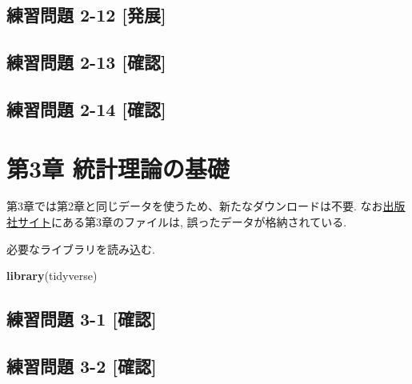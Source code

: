 \documentclass[
]{book}
\newenvironment{Shaded}{\begin{snugshade}}{\end{snugshade}}
\newcommand{\FunctionTok}[1]{\textcolor[rgb]{0.13,0.29,0.53}{\textbf{#1}}}
\newcommand{\NormalTok}[1]{#1}
\begin{document}
\hypertarget{ux7df4ux7fd2ux554fux984c-2-12-ux767aux5c55}{%
\section*{練習問題 2-12 {[}発展{]}}\label{ux7df4ux7fd2ux554fux984c-2-12-ux767aux5c55}}

\hypertarget{ux7df4ux7fd2ux554fux984c-2-13-ux78baux8a8d}{%
\section*{練習問題 2-13 {[}確認{]}}\label{ux7df4ux7fd2ux554fux984c-2-13-ux78baux8a8d}}

\hypertarget{ux7df4ux7fd2ux554fux984c-2-14-ux78baux8a8d}{%
\section*{練習問題 2-14 {[}確認{]}}\label{ux7df4ux7fd2ux554fux984c-2-14-ux78baux8a8d}}

\hypertarget{ch3}{%
\chapter*{第3章 統計理論の基礎}\label{ch3}}

第3章では第2章と同じデータを使うため、新たなダウンロードは不要.
なお\href{https://www.yuhikaku.co.jp/books/detail/9784641053854}{出版社サイト}にある第3章のファイルは, 誤ったデータが格納されている.

必要なライブラリを読み込む.

\begin{Shaded}
\begin{Highlighting}[]
\FunctionTok{library}\NormalTok{(tidyverse)}
\end{Highlighting}
\end{Shaded}

\hypertarget{ux7df4ux7fd2ux554fux984c-3-1-ux78baux8a8d}{%
\section*{練習問題 3-1 {[}確認{]}}\label{ux7df4ux7fd2ux554fux984c-3-1-ux78baux8a8d}}

\hypertarget{ux7df4ux7fd2ux554fux984c-3-2-ux78baux8a8d}{%
\section*{練習問題 3-2 {[}確認{]}}\label{ux7df4ux7fd2ux554fux984c-3-2-ux78baux8a8d}}
\end{document}
